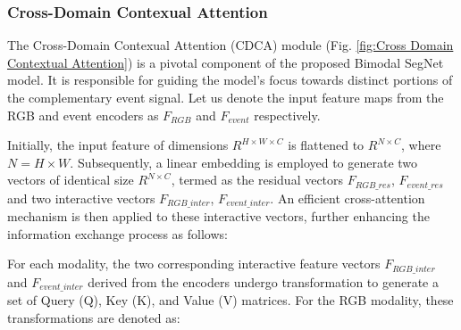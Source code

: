 \documentclass[lettersize,journal]{IEEEtran}
\begin{document}
\subsubsection{ \textbf{Cross-Domain Contexual Attention }}
\label{subsubsection : Cross-Domain Contexual Attention}


The Cross-Domain Contexual Attention (CDCA) module (Fig. \ref{fig:Cross Domain Contextual Attention}) is a pivotal component of the proposed Bimodal SegNet model. It is responsible for guiding the model's focus towards distinct portions of the complementary event signal. Let us denote the input feature maps from the RGB and event encoders as $F_{RGB}$ and $F_{event}$ respectively.

Initially, the input feature of dimensions $R^{H\times W\times C}$ is flattened to $R^{N\times C}$, where $N = H \times W$. Subsequently, a linear embedding is employed to generate two vectors of identical size $R^{N\times C}$, termed as the residual vectors $F_{RGB\_res}$, $F_{event\_res}$ and two interactive vectors $F_{RGB\_inter}$, $F_{event\_inter}$. An efficient cross-attention mechanism is then applied to these interactive vectors, further enhancing the information exchange process as follows:


\begin{figure*}[t!]
\caption{\footnotesize
{ Cross Domain Contextual Attention - The Bimodal SegNet utilizes Cross-Domain Contextual Attention (CDCA) to guide its focus on distinct portions of the signal, using input features from RGB and event encoders. The model employs an attention mechanism between the linearly embedded residual and interactive vectors. With each modality generating Query, Key, and Value matrices, a cross-attention process forms attended results. These results, along with the residual vectors, are then concatenated to create attention-augmented features, which combine with original features to produce enhanced representations. The final output is a fusion of information from both modalities, passed through a 1x1 convolution for consolidated, fused features.   }
}
\label{fig:Cross Domain Contextual Attention}
\end{figure*}


For each modality, the two corresponding interactive feature vectors $F_{RGB\_inter}$ and $F_{event\_inter}$ derived from the encoders undergo transformation to generate a set of Query (Q), Key (K), and Value (V) matrices. For the RGB modality, these transformations are denoted as:
\end{document}
